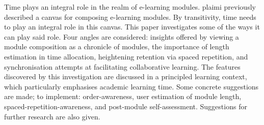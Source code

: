 Time plays an integral role in the realm of e-learning modules. plaimi 
previously described a canvas for composing e-learning modules. By 
transitivity, time needs to play an integral role in this canvas. This paper 
investigates some of the ways it can play said role. Four angles are 
considered: insights offered by viewing a module composition as a chronicle of 
modules, the importance of length estimation in time allocation, heightening 
retention via spaced repetition, and synchronisation attempts at facilitating 
collaborative learning. The features discovered by this investigation are 
discussed in a principled learning context, which particularly emphasises 
academic learning time. Some concrete suggestions are made; to implement: 
order-awareness, user estimation of module length, 
spaced-repetition-awareness, and post-module self-assessment. Suggestions for 
further research are also given.
